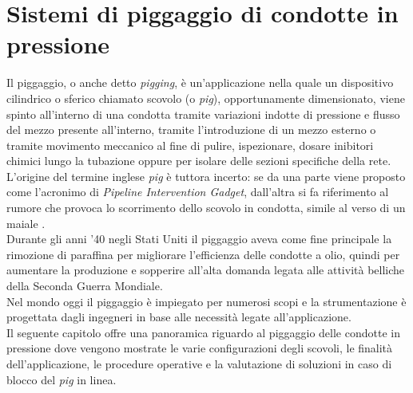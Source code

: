 \clearpage{\pagestyle{empty}\cleardoublepage}

\chapter{Sistemi di piggaggio di condotte in pressione}\thispagestyle{empty} 
Il piggaggio, o anche detto \textit{pigging}, è un'applicazione nella quale un dispositivo cilindrico o sferico chiamato scovolo (o \textit{pig}), opportunamente dimensionato, viene spinto all'interno di una condotta tramite variazioni indotte di pressione e flusso del mezzo presente all'interno, tramite l'introduzione di un mezzo esterno o tramite movimento meccanico al fine di pulire, ispezionare, dosare inibitori chimici lungo la tubazione oppure per isolare delle sezioni specifiche della rete.\\
L'origine del termine inglese \textit{pig} è tuttora incerto: se da una parte viene proposto come l'acronimo di \textit{Pipeline Intervention Gadget}, dall'altra si fa riferimento al rumore che provoca lo scorrimento dello scovolo in condotta, simile al verso di un maiale \parencite{varghese2011intelligent}.\\
Durante gli anni '40 negli Stati Uniti il piggaggio aveva come fine principale la rimozione di paraffina per migliorare l'efficienza delle condotte a olio, quindi per aumentare la produzione e sopperire all'alta domanda legata alle attività belliche della Seconda Guerra Mondiale.\\
Nel mondo oggi il piggaggio è impiegato per numerosi scopi e la strumentazione  è progettata dagli ingegneri in base alle necessità legate all'applicazione.\\
Il seguente capitolo offre una panoramica riguardo al piggaggio delle condotte in pressione dove vengono mostrate le varie configurazioni degli scovoli, le finalità dell'applicazione, le procedure operative e la valutazione di soluzioni in caso di blocco del \textit{pig} in linea.

